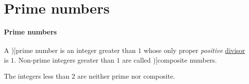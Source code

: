 \section{Prime numbers}\label{sec:prime_numbers}

\paragraph{Prime numbers}

\begin{definition}\label{def:prime_number}
  A \term[ru=простое (число) (\cite[256]{Хинчин1951ЭлементыТеорииЧисел})]{prime number} is an integer greater than \( 1 \) whose only proper \emph{positive} \hyperref[def:semiring_divisibility]{divisor} is \( 1 \). Non-prime integers greater than \( 1 \) are called \term[ru=составное (число) (\cite[256]{Хинчин1951ЭлементыТеорииЧисел})]{composite numbers}.
\end{definition}
\begin{comments}
  \item The integers less than \( 2 \) are neither prime nor composite.
\end{comments}

